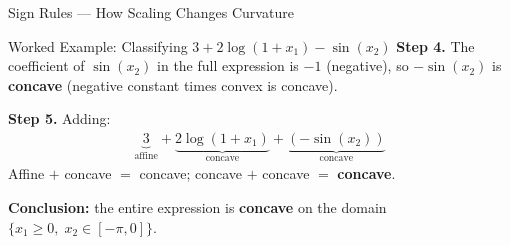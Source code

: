 \documentclass[aspectratio=169,10pt]{beamer}
\begin{document}
\begin{frame}[allowframebreaks]{Sign Rules --- How Scaling Changes Curvature}
\begin{exampleblock}{Worked Example: Classifying $3 + 2\log(1+x_1) - \sin(x_2)$}
    \medskip
    \textbf{Step 4.}  The coefficient of $\sin(x_2)$ in the full
    expression is $-1$ (negative), so $-\sin(x_2)$ is \textbf{concave}
    (negative constant times convex is concave).

    \medskip
    \textbf{Step 5.}  Adding:
    \begin{align*}
      \underbrace{3}_{\text{affine}} +
      \underbrace{2\log(1+x_1)}_{\text{concave}} +
      \underbrace{(-\sin(x_2))}_{\text{concave}}
    \end{align*}
    Affine $+$ concave $=$ concave; concave $+$ concave $=$
    \textbf{concave}.

    \medskip
    \textbf{Conclusion:} the entire expression is \textbf{concave}
    on the domain $\{x_1 \geq 0,\; x_2 \in [-\pi,0]\}$.
  \end{exampleblock}

\end{frame}
\end{document}
